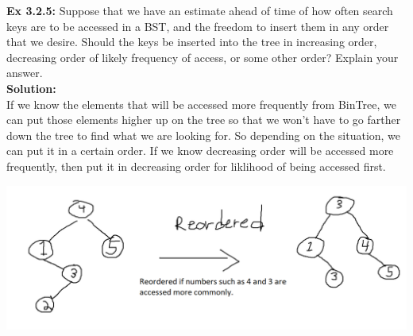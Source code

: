 \documentclass[11pt,fleqn]{article}
\begin{document}
\textbf{Ex 3.2.5:} Suppose that we have an estimate ahead of time of how often search keys are
to be accessed in a BST, and the freedom to insert them in any order that we desire.
Should the keys be inserted into the tree in increasing order, decreasing order of likely
frequency of access, or some other order? Explain your answer.\\
	
\textbf{Solution:}\\
If we know the elements that will be accessed more frequently from BinTree, we can put those elements higher up on the tree so that we won't have to go farther down the tree to find what we are looking for. So depending on the situation, we can put it in a certain order. If we know decreasing order will be accessed more frequently, then put it in decreasing order for liklihood of being accessed first.

\begin{center}
	\includegraphics[scale=.35]{3.2.5.png}
\end{center}
\end{document}
